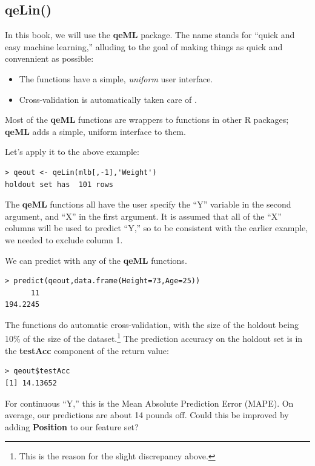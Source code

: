 \subsection{qeLin()}

In this book, we will use the \textbf{qeML} package.  The name stands
for ``quick and easy machine learning,'' alluding to the goal of making
things as quick and convennient as possible:

\begin{itemize}

\item The functions have a simple, \textit{uniform} user interface.

\item Cross-validation is automatically taken care of .

\end{itemize} 

Most of the \textbf{qeML} functions are wrappers to functions in other R
packages; \textbf{qeML} adds a simple, uniform interface to them.

Let's apply it to the above example:

\begin{lstlisting}
> qeout <- qeLin(mlb[,-1],'Weight')
holdout set has  101 rows
\end{lstlisting}

The \textbf{qeML} functions all have the user specify the ``Y'' variable
in the second argument, and ``X'' in the first argument.  It is assumed
that all of the ``X'' columns will be used to predict ``Y,'' so to be
consistent with the earlier example, we needed to exclude column 1.

We can predict with any of the \textbf{qeML} functions.

\begin{lstlisting}
> predict(qeout,data.frame(Height=73,Age=25))
      11 
194.2245 
\end{lstlisting}

The functions do automatic cross-validation, with the size of the
holdout being 10\% of the size of the dataset.\footnote{This is the
reason for the slight discrepancy above.} The prediction accuracy on the
holdout set is in the \textbf{testAcc} component of the return value:

\begin{lstlisting}
> qeout$testAcc
[1] 14.13652
\end{lstlisting}

For continuous ``Y,'' this is the Mean Absolute Prediction Error
(MAPE).  On average, our predictions are about 14 pounds off.
Could this be improved by adding \textbf{Position} to our feature set?

